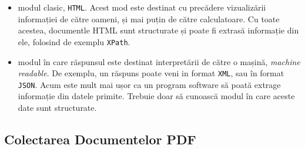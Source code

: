 \begin{itemize}
\item modul clasic, \texttt{HTML}. Acest mod este destinat cu precădere vizualizării informației de către oameni, și mai puțin de către calculatoare. Cu toate acestea, documentle HTML sunt structurate și poate fi extrasă informație din ele, folosind de exemplu \texttt{XPath}.


\item modul în care răspunsul este destinat interpretării de către o mașină, \textit{machine readable}. De exemplu, un răspuns poate veni in format \texttt{XML}, sau în format \texttt{JSON}. Acum este mult mai ușor ca un program software să poată extrage informație din datele primite. Trebuie doar să cunoască modul în care aceste date sunt structurate.
\end{itemize}

\subsection{Colectarea Documentelor PDF}


